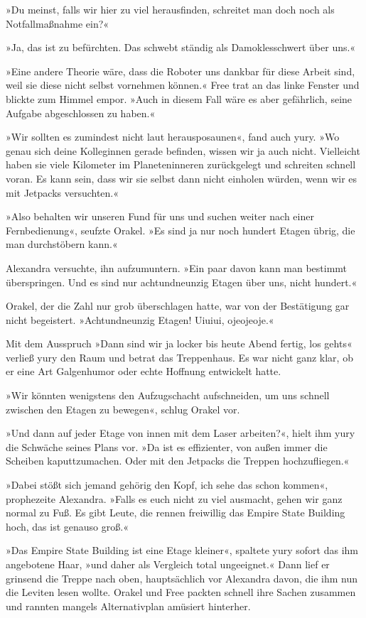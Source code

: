 »Du meinst, falls wir hier zu viel herausfinden, schreitet man doch noch als Notfallmaßnahme ein?«

»Ja, das ist zu befürchten. Das schwebt ständig als Damoklesschwert über uns.«

»Eine andere Theorie wäre, dass die Roboter uns dankbar für diese Arbeit sind, weil sie diese nicht selbst vornehmen können.« Free trat an das linke Fenster und blickte zum Himmel empor. »Auch in diesem Fall wäre es aber gefährlich, seine Aufgabe abgeschlossen zu haben.«

»Wir sollten es zumindest nicht laut herausposaunen«, fand auch yury. »Wo genau sich deine Kolleginnen gerade befinden, wissen wir ja auch nicht. Vielleicht haben sie viele Kilometer im Planeteninneren zurückgelegt und schreiten schnell voran. Es kann sein, dass wir sie selbst dann nicht einholen würden, wenn wir es mit Jetpacks versuchten.«

»Also behalten wir unseren Fund für uns und suchen weiter nach einer Fernbedienung«, seufzte Orakel. »Es sind ja nur noch hundert Etagen übrig, die man durchstöbern kann.«

Alexandra versuchte, ihn aufzumuntern. »Ein paar davon kann man bestimmt überspringen. Und es sind nur achtundneunzig Etagen über uns, nicht hundert.«

Orakel, der die Zahl nur grob überschlagen hatte, war von der Bestätigung gar nicht begeistert. »Achtundneunzig Etagen! Uiuiui, ojeojeoje.«

Mit dem Ausspruch »Dann sind wir ja locker bis heute Abend fertig, los gehts« verließ yury den Raum und betrat das Treppenhaus. Es war nicht ganz klar, ob er eine Art Galgenhumor oder echte Hoffnung entwickelt hatte.

»Wir könnten wenigstens den Aufzugschacht aufschneiden, um uns schnell zwischen den Etagen zu bewegen«, schlug Orakel vor.

»Und dann auf jeder Etage von innen mit dem Laser arbeiten?«, hielt ihm yury die Schwäche seines Plans vor. »Da ist es effizienter, von außen immer die Scheiben kaputtzumachen. Oder mit den Jetpacks die Treppen hochzufliegen.«

»Dabei stößt sich jemand gehörig den Kopf, ich sehe das schon kommen«, prophezeite Alexandra. »Falls es euch nicht zu viel ausmacht, gehen wir ganz normal zu Fuß. Es gibt Leute, die rennen freiwillig das Empire State Building hoch, das ist genauso groß.«

»Das Empire State Building ist eine Etage kleiner«, spaltete yury sofort das ihm angebotene Haar, »und daher als Vergleich total ungeeignet.« Dann lief er grinsend die Treppe nach oben, hauptsächlich vor Alexandra davon, die ihm nun die Leviten lesen wollte. Orakel und Free packten schnell ihre Sachen zusammen und rannten mangels Alternativplan amüsiert hinterher.

